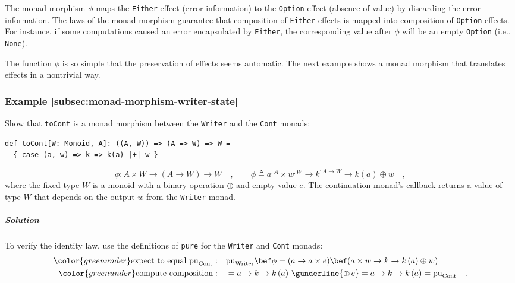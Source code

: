 The monad morphism $\phi$ maps the \lstinline!Either!-effect (error
information) to the \lstinline!Option!-effect (absence of value)
by discarding the error information. The laws of the monad morphism
guarantee that composition of \lstinline!Either!-effects is mapped
into composition of \lstinline!Option!-effects. For instance, if
some computations caused an error encapsulated by \lstinline!Either!,
the corresponding value after $\phi$ will be an empty \lstinline!Option!
(i.e., \lstinline!None!). 

The function $\phi$ is so simple that the preservation of effects
seems automatic. The next example shows a monad morphism that translates
effects in a nontrivial way.

\subsubsection{Example \label{subsec:monad-morphism-writer-state}\ref{subsec:monad-morphism-writer-state}}

Show that \lstinline!toCont! is a monad morphism between the \lstinline!Writer!
and the \lstinline!Cont! monads:
\begin{lstlisting}
def toCont[W: Monoid, A]: ((A, W)) => (A => W) => W =
  { case (a, w) => k => k(a) |+| w }
\end{lstlisting}
\[
\phi:A\times W\rightarrow\left(A\rightarrow W\right)\rightarrow W\quad,\quad\quad\phi\triangleq a^{:A}\times w^{:W}\rightarrow k^{:A\rightarrow W}\rightarrow k\left(a\right)\oplus w\quad,
\]
where the fixed type $W$ is a monoid with a binary operation $\oplus$
and empty value $e$. The continuation monad\textsf{'}s callback returns a
value of type $W$ that depends on the output $w$ from the \lstinline!Writer!
monad.

\subparagraph{Solution}

To verify the identity law, use the definitions of \lstinline!pure!
for the \lstinline!Writer! and \lstinline!Cont! monads:
\begin{align*}
{\color{greenunder}\text{expect to equal }\text{pu}_{\text{Cont}}:}\quad & \text{pu}_{\text{Writer}}\bef\phi=(a\rightarrow a\times e)\bef(a\times w\rightarrow k\rightarrow k\left(a\right)\oplus w)\\
{\color{greenunder}\text{compute composition}:}\quad & =a\rightarrow k\rightarrow k\left(a\right)\,\gunderline{\oplus\,e}=a\rightarrow k\rightarrow k\left(a\right)=\text{pu}_{\text{Cont}}\quad.
\end{align*}

